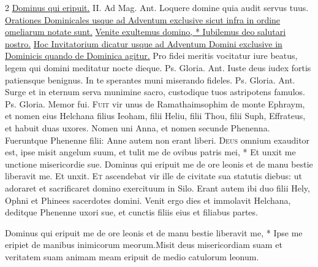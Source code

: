 \begin{multicols*}{2}
\newline \R \hyperlink{dominus-qui-eripuit}{Dominus qui eripuit.} {\color{Red} II. Ad Mag. Ant.} Loquere domine quia audit servus tuus.
\newline \ul{Orationes Dominicales usque ad Adventum exclusive sicut infra in ordine omeliarum notate sunt.}
 \hyperlink{venite-exultemus-domino-invitatorium}{Venite exultemus domino, * Iubilemus deo salutari nostro.}
\newline \ul{Hoc Invitatorium dicatur usque ad Adventum Domini exclusive in Dominicis quando de Dominica agitur.}
 Pro fidei meritis vocitatur iure beatus, legem qui domini meditatur nocte dieque. {\color{Red} Ps.}     Gloria. {\color{Red} Ant.} Iuste deus iudex fortis patiensque benignus. In te sperantes muni miserando fideles. {\color{Red} Ps.}     Gloria. {\color{Red} Ant.} Surge et in eternum serva munimine sacro, custodique tuos astripotens famulos. {\color{Red} Ps.}     Gloria. \V Memor fui.
\lettrine[lines=2]{\zallmancaps \color{Red} F}{uit} vir unus de Ramathaimsophim de monte Ephraym, et nomen eius Helchana filius Ieoham, filii Heliu, filii Thou, filii Suph, Effrateus, et habuit duas uxores. Nomen uni Anna, et nomen secunde Phenenna. Fueruntque Phenenne filii: Anne autem non erant liberi. \R
\lettrine[lines=2]{\zallmancaps \color{Blue} D}{eus} \hypertarget{deus-omnium}{\label{deus-omnium}} omnium exauditor est, ipse misit angelum suum, et tulit me de ovibus patris mei, * Et unxit me unctione misericordie sue. \V Dominus qui eripuit me de ore leonis et de manu bestie liberavit me. Et unxit.
\lettrine[lines=2]{\zallmancaps \color{Red} E}{t} ascendebat vir ille de civitate sua statutis diebus: ut adoraret et sacrificaret domino exercituum in Silo. Erant autem ibi duo filii Hely, Ophni et Phinees sacerdotes domini. Venit ergo dies et immolavit Helchana, deditque Phenenne uxori sue, et cunctis filiis eius et filiabus partes.
\begin{responsory}
{Dominus qui eripuit me de ore leonis et de manu bestie liberavit me, * Ipse me eripiet de manibus inimicorum meorum.}{Misit deus misericordiam suam et veritatem suam animam meam eripuit de medio catulorum leonum.}

\end{responsory}
\end{multicols*}
